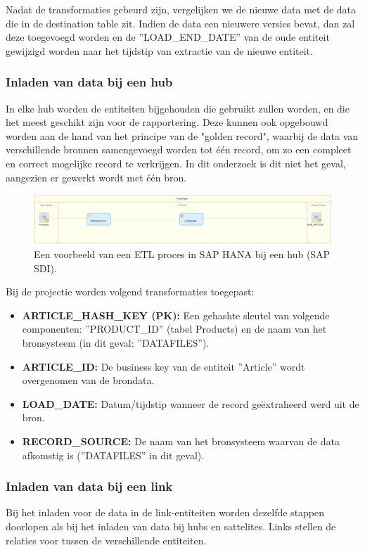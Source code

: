 Nadat de transformaties gebeurd zijn, vergelijken we de nieuwe data met de data die in de destination table zit. Indien de data een nieuwere versies bevat, dan zal deze toegevoegd worden en de ''LOAD\_END\_DATE'' van de oude entiteit gewijzigd worden naar het tijdstip van extractie van de nieuwe entiteit.

\subsubsection{Inladen van data bij een hub}
In elke hub worden de entiteiten bijgehouden die gebruikt zullen worden, en die het meest geschikt zijn voor de rapportering. Deze kunnen ook opgebouwd worden aan de hand van het principe van de "golden record", waarbij de data van verschillende bronnen samengevoegd worden tot één record, om zo een compleet en correct mogelijke record te verkrijgen. In dit onderzoek is dit niet het geval, aangezien er gewerkt wordt met één bron. 

\begin{figure}[h]
	\centering
	\includegraphics[scale=0.45]{../images/DV_FG_hub.png}
	\caption{Een voorbeeld van een ETL proces in SAP HANA bij een hub (SAP SDI).}
	\label{fig:etlhub}
\end{figure}

Bij de projectie worden volgend transformaties toegepast:

\begin{itemize}
	\item \textbf{ARTICLE\_HASH\_KEY (PK):} Een gehashte sleutel van volgende componenten: ''PRODUCT\_ID'' (tabel Products) en de naam van het bronsysteem (in dit geval: ''DATAFILES'').
	\item \textbf{ARTICLE\_ID:} De business key van de entiteit ''Article'' wordt overgenomen van de brondata.
	\item \textbf{LOAD\_DATE:} Datum/tijdstip wanneer de record geëxtraheerd werd uit de bron.
	\item \textbf{RECORD\_SOURCE:} De naam van het bronsysteem waarvan de data afkomstig is (''DATAFILES'' in dit geval).
\end{itemize}

\subsubsection{Inladen van data bij een link}
Bij het inladen voor de data in de link-entiteiten worden dezelfde stappen doorlopen als bij het inladen van data bij hubs en sattelites. Links stellen de relaties voor tussen de verschillende entiteiten. 

